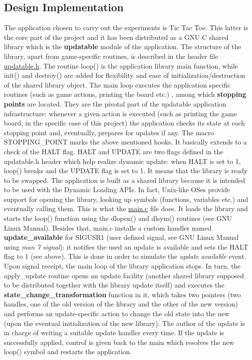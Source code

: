 \documentclass[10pt,a4]{article}
\begin{document}
\subsection{Design Implementation}
The application chosen to carry out the experiments is Tic Tac Toe. This latter is the core part of the project and it has been distributed as a GNU C shared library which is the \textbf{updatable} module of the application. The structure of the library, apart from game-specific routines, is described in the header file \href{https://github.com/ubersandro/ESProject_Dynamic_Software_Update/blob/master/include/updatable.h}{updatable.h}. The routine loop() is the application library main function, while init() 
and destroy() are added for flexibility and ease of initialization/destruction of the shared library object. The main loop executes the application specific routines (such as game actions, printing the board etc.) , among which \textbf{stopping points} are located. They are the pivotal part of the updatable application infrastructure: whenever a given action is executed (such as printing the game board, in the specific case of this project) the application checks its state at each stopping point and, eventually, prepares for updates if any. The macro STOPPING\_POINT marks the above mentioned hooks. It basically extends to a check of the HALT flag.  HALT and UPDATE are two flags defined in the updatable.h header which help realize dynamic update: when HALT is set to 1, loop() breaks and the UPDATE flag is set to 1. It means that the library is ready to be swapped. 
\newline
The application is built as a shared library because it is intended to be used with the Dynamic Loading APIs.
In fact, Unix-like OSes provide support for opening the library, looking up symbols (functions, variables etc.) and eventually calling them. This is what the \href{https://github.com/ubersandro/ESProject_Dynamic_Software_Update/blob/master/src/main.c}{main.c} file does. It loads the library and starts the loop() function using the dlopen() and dlsym() routines (see GNU Linux Manual). 
\newline
Besides that, main.c installs a custom handler named \textbf{update\_available} for SIGUSR1 (user defined signal, see GNU Linux Manual using \textit{man 7 signal}): it notifies the used an update is available and sets the HALT flag to 1 (see above). This is done in order to simulate the \textit{update available} event. Upon signal receipt, the main loop of the library application stops. In turn, the apply\_update routine opens an update facility (another shared library supposed to be distributed together with the library update itself) and executes the \textbf{state\_change\_transformation} function in it, which takes two pointers (two handles, one of the old version of the library and the other of the new version) and performs an update-specific action to change the old state into the new (upon the eventual initialization of the new library). The author of the update is in charge of writing a suitable update handler every time. 
\newline
If the update is successfully applied, control is given back to the main which resolves the new loop() symbol and restarts the application. 
\end{document}
